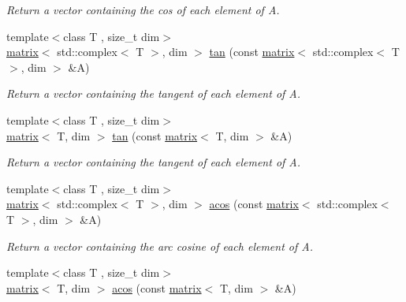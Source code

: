 \begin{DoxyCompactItemize}
\begin{DoxyCompactList}\small\item\em Return a vector containing the cos of each element of A. \end{DoxyCompactList}\item 
\hypertarget{namespacekeycpp_a8e81f8ab9b05b8eaf07be99e141ce1c9}{{\footnotesize template$<$class T , size\-\_\-t dim$>$ }\\\hyperlink{classkeycpp_1_1matrix}{matrix}$<$ std\-::complex$<$ T $>$, dim $>$ \hyperlink{namespacekeycpp_a8e81f8ab9b05b8eaf07be99e141ce1c9}{tan} (const \hyperlink{classkeycpp_1_1matrix}{matrix}$<$ std\-::complex$<$ T $>$, dim $>$ \&A)}\label{namespacekeycpp_a8e81f8ab9b05b8eaf07be99e141ce1c9}

\begin{DoxyCompactList}\small\item\em Return a vector containing the tangent of each element of A. \end{DoxyCompactList}\item 
\hypertarget{namespacekeycpp_a3af9d4ca9aedc999153a2dd305a6e95e}{{\footnotesize template$<$class T , size\-\_\-t dim$>$ }\\\hyperlink{classkeycpp_1_1matrix}{matrix}$<$ T, dim $>$ \hyperlink{namespacekeycpp_a3af9d4ca9aedc999153a2dd305a6e95e}{tan} (const \hyperlink{classkeycpp_1_1matrix}{matrix}$<$ T, dim $>$ \&A)}\label{namespacekeycpp_a3af9d4ca9aedc999153a2dd305a6e95e}

\begin{DoxyCompactList}\small\item\em Return a vector containing the tangent of each element of A. \end{DoxyCompactList}\item 
\hypertarget{namespacekeycpp_a74731028e7d006f90426aff4547c82e1}{{\footnotesize template$<$class T , size\-\_\-t dim$>$ }\\\hyperlink{classkeycpp_1_1matrix}{matrix}$<$ std\-::complex$<$ T $>$, dim $>$ \hyperlink{namespacekeycpp_a74731028e7d006f90426aff4547c82e1}{acos} (const \hyperlink{classkeycpp_1_1matrix}{matrix}$<$ std\-::complex$<$ T $>$, dim $>$ \&A)}\label{namespacekeycpp_a74731028e7d006f90426aff4547c82e1}

\begin{DoxyCompactList}\small\item\em Return a vector containing the arc cosine of each element of A. \end{DoxyCompactList}\item 
\hypertarget{namespacekeycpp_aa4671e6b0c2be8f6411419d4615b2442}{{\footnotesize template$<$class T , size\-\_\-t dim$>$ }\\\hyperlink{classkeycpp_1_1matrix}{matrix}$<$ T, dim $>$ \hyperlink{namespacekeycpp_aa4671e6b0c2be8f6411419d4615b2442}{acos} (const \hyperlink{classkeycpp_1_1matrix}{matrix}$<$ T, dim $>$ \&A)}\label{namespacekeycpp_aa4671e6b0c2be8f6411419d4615b2442}


\end{DoxyCompactItemize}
